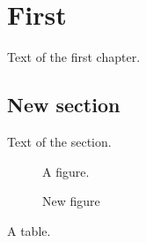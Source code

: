\documentclass{report}
\begin{document}
\dominitoc
\dominilof
\dominilot
\tableofcontents
\listoffigures
\listoftables
\chapter{First}
\minitoc
\minilof
\minilot
Text of the first chapter.
\section{New section}
Text of the section.
\begin{figure}[h]
\centering A figure.
\caption{New figure}
\end{figure}
\begin{table}[h]
\centering A table.
\caption{New table}
\end{table}
\end{document}
